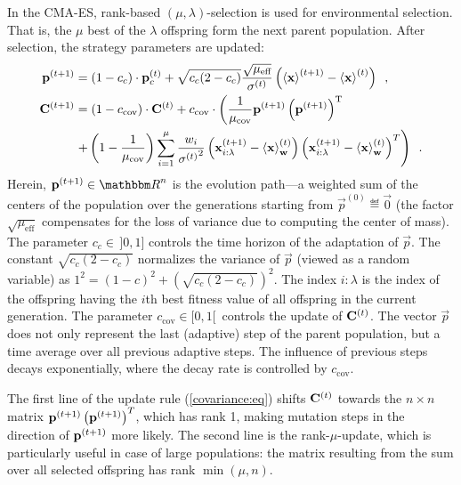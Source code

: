 In the CMA-ES, rank-based $(\mu,\lambda)$-selection is used for
environmental selection. That is, the $\mu$ best of the $\lambda$
offspring form the next parent population.  After selection, the
strategy parameters are updated:
\begin{align}\label{pathAdapt:eq}
  \mathbf{p}^{(t+1)} &= (1-c_c)\cdot\mathbf{p}_c^{(t)}+
\sqrt{c_c(2-c_c)}\frac{\sqrt{\mu_\text{eff}}}{\sigma^{(t)}}
\left(\left<{\mathbf{x}}\right>^{(t+1)}-\left<{\mathbf{x}}\right>^{(t)}\right)\enspace,\\
\mathbf{C}^{(t+1)} &= (1-c_{\text{cov}})\cdot {\mathbf{C}}^{(t)}
  + c_{\text{cov}}\cdot 
\left(\frac{1}{\mu_{\text{cov}}}
\mathbf{p}^{(t+1)}
  \left(\mathbf{p}^{(t+1)} \right)^{\text{T}}\right.\nonumber\\
&\left.+\left(1-\frac{1}{\mu_{\text{cov}}}\right)
\sum_{i=1}^\mu
\frac{w_i}{{\sigma^{(t)}}^2}
\left(\mathbf{x}_{i:\lambda}^{(t+1)}-\left<{\mathbf{x}}\right>^{(t)}_{\mathbf{w}} \right)
\left(\mathbf{x}_{i:\lambda}^{(t+1)}-\left<{\mathbf{x}}\right>^{(t)}_{\mathbf{w}} \right)^T
\right)
\enspace.\label{covariance:eq}
\end{align}
Herein, $\vec{p}\btnextb\in {\mathbbm R}^n$ is the evolution path---a
weighted sum of the centers of the population over the generations
starting from $\vec{p}^{(0)}\eqdef\vec 0$
(the factor $\sqrt{\mu_\text{eff}}$ compensates for the loss of variance due to
computing the center of mass). The parameter $c_c\in\, ]0,1]$ controls
the time horizon of the adaptation of $\vec{p}$.  The constant
$\sqrt{c_c(2-c_c)}$ normalizes the variance of $\vec{p}$
(viewed as a random variable) as $1^2=(1-c)^2+ (\sqrt{c_c(2-c_c)})^2$.  
The index $i$$:$$\lambda$ is the index of
the offspring having the $i$th best fitness value of all offspring in
the current generation.
The parameter $c_{\text{cov}}\in [0,1[\,$ controls the update of
${\mathbf{C}}^{(t)}$. The vector
$\vec{p}$ does not only represent the last (adaptive) step of
 the parent population, but a time average over
all previous adaptive steps. The influence of previous steps
decays exponentially, where the decay rate is controlled by $c_{\text{cov}}$.
                                                                                
The first line of the update rule (\ref{covariance:eq}) shifts $\mathbf{C}^{(t)}$ towards
the $n\times n$ matrix
$\mathbf{p}^{(t+1)}\left(\mathbf{p}^{(t+1)}\right)^T$, which has rank 1, making mutation steps
in the direction of $\mathbf{p}^{(t+1)}$ more likely.  
The second line is the rank-$\mu$-update, which is particularly useful in case
of large populations: the matrix resulting from the sum over all selected
offspring has rank $\min(\mu,n)$.
                                                                                

